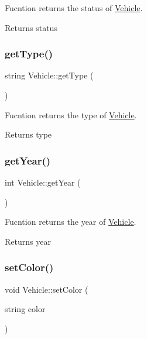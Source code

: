 Fucntion returns the status of \hyperlink{class_vehicle}{Vehicle}. \begin{DoxyReturn}{Returns}
status 
\end{DoxyReturn}
\mbox{\label{class_vehicle_a540c0784a94f351f90011a7e9fee39f0}} 
\subsubsection{\texorpdfstring{get\+Type()}{getType()}}
{\footnotesize\ttfamily string Vehicle\+::get\+Type (\begin{DoxyParamCaption}{ }\end{DoxyParamCaption})}

Fucntion returns the type of \hyperlink{class_vehicle}{Vehicle}. \begin{DoxyReturn}{Returns}
type 
\end{DoxyReturn}
\mbox{\label{class_vehicle_a206f357a7b9202335f143c1ca3477ef1}} 
\subsubsection{\texorpdfstring{get\+Year()}{getYear()}}
{\footnotesize\ttfamily int Vehicle\+::get\+Year (\begin{DoxyParamCaption}{ }\end{DoxyParamCaption})}

Fucntion returns the year of \hyperlink{class_vehicle}{Vehicle}. \begin{DoxyReturn}{Returns}
year 
\end{DoxyReturn}
\mbox{\label{class_vehicle_acdf4eb878866cb43045cd0c62ad808cd}} 
\subsubsection{\texorpdfstring{set\+Color()}{setColor()}}
{\footnotesize\ttfamily void Vehicle\+::set\+Color (\begin{DoxyParamCaption}\item[{string}]{color }\end{DoxyParamCaption})}

